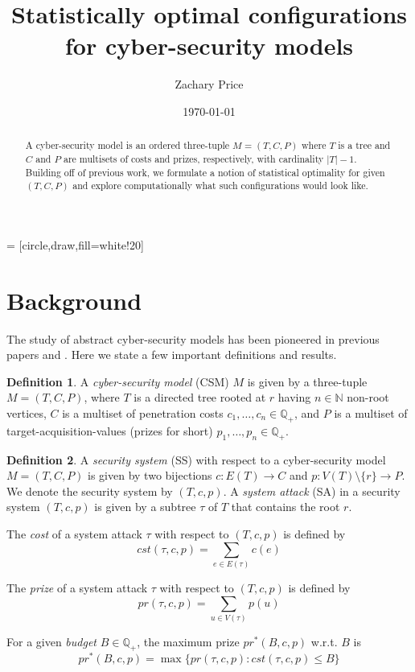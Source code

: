 \documentclass[a4paper]{amsproc}
\title{Statistically optimal configurations for cyber-security models}
\author[Price]{Zachary Price}
\date{\today}
\theoremstyle{plain}
\theoremstyle{named}
\theoremstyle{definition}
\newtheorem{definition}{Definition}
\newcommand{\N} {\mathbb{N}}
\newcommand{\Q} {\mathbb{Q}}
\begin{document}
 = [circle,draw,fill=white!20]

\vspace{18mm} \setcounter{page}{1} \thispagestyle{empty}

\begin{abstract}
  A cyber-security model is an ordered three-tuple $M = (T, C, P)$ where $T$ is a tree and $C$ and $P$ are multisets of costs and prizes, respectively, with cardinality $|T|-1$.
  Building off of previous work, we formulate a notion of statistical optimality for given $(T, C, P)$ and explore computationally what such configurations would look like.
\end{abstract}

\maketitle

\section{Background}

The study of abstract cyber-security models has been pioneered in previous papers \cite{agk1} and \cite{agk2}.
Here we state a few important definitions and results.

\begin{definition}
A \emph{cyber-security model} (CSM) $M$ is given by a three-tuple $M= (T, C, P)$, where $T$ is a directed tree rooted at $r$ having $n\in\N$ non-root vertices, $C$ is a multiset of penetration costs $c_1,\ldots,c_n\in\Q_+$, and $P$ is a multiset of target-acquisition-values (prizes for short) $p_1,\ldots,p_n\in\Q_+$.
\end{definition}

\begin{definition}
A \emph{security system} (SS) with respect to a cyber-security model $M=(T,C,P)$ is given by two bijections $c:E(T)\rightarrow C$ and $p:V(T)\setminus\{r\}\rightarrow P$.
We denote the security system by $(T,c,p)$.
A \emph{system attack} (SA) in a security system $(T,c,p)$ is given by a subtree $\tau$ of $T$ that contains the root $r$.

The \emph{cost} of a system attack $\tau$ with respect to $(T,c,p)$ is defined by
$$cst(\tau,c,p)=\sum_{e\in E(\tau)}c(e)$$

The \emph{prize} of a system attack $\tau$ with respect to $(T,c,p)$ is defined by
$$pr(\tau,c,p)=\sum_{u\in V(\tau)} p(u)$$

For a given \emph{budget} $B\in\Q_+$, the maximum prize $pr^*(B,c,p)$ w.r.t. $B$ is
$$pr^*(B,c,p) = \max\{pr(\tau,c,p) : cst(\tau,c,p)\leq B\}$$
\end{definition}
\end{document}
